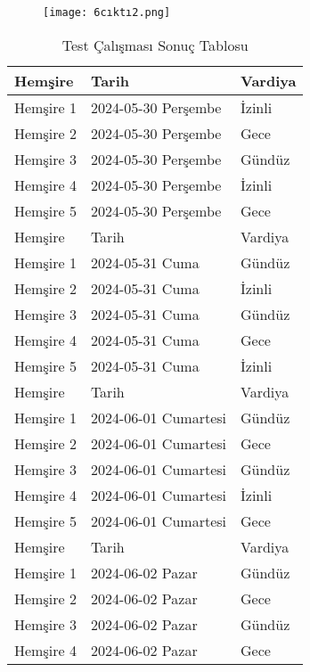\documentclass[12pt, a4paper]{article}
\begin{document}
\begin{flushleft}
\begin{figure}[!h]
	\centering
	\texttt{[image: 6cıktı2.png]}
	\\[20pt]
\end{figure}

\begin{table}
	\begin{flushleft}
		\caption{Test Çalışması Sonuç Tablosu}
	\end{flushleft}
	
\begin{tabular}{l|l|l|}
	
	\rowcolor{yellow}
	Hemşire & Tarih & Vardiya  \\
	\hline
	Hemşire 1  & 2024-05-30 Perşembe  &  İzinli  \\
	Hemşire	2 & 2024-05-30 Perşembe & Gece  \\
	Hemşire	3 & 2024-05-30 Perşembe & Gündüz \\
	Hemşire	4 & 2024-05-30 Perşembe & İzinli \\
	Hemşire	5 & 2024-05-30 Perşembe & Gece \\
	\rowcolor{yellow}
	\hline Hemşire & Tarih & Vardiya  \\
	\hline
	Hemşire 1  & 2024-05-31 Cuma  &  Gündüz  \\
	Hemşire	2 & 2024-05-31 Cuma & İzinli  \\
	Hemşire	3 & 2024-05-31 Cuma & Gündüz\\
	Hemşire	4 & 2024-05-31 Cuma & Gece \\
	Hemşire	5 & 2024-05-31 Cuma & İzinli\\
	\rowcolor{yellow}
	\hline Hemşire & Tarih & Vardiya  \\
	\hline
	Hemşire 1  & 2024-06-01 Cumartesi  &  Gündüz  \\
	Hemşire	2 & 2024-06-01 Cumartesi & Gece  \\
	Hemşire	3 & 2024-06-01 Cumartesi & Gündüz \\
	Hemşire	4 & 2024-06-01 Cumartesi & İzinli \\
	Hemşire	5 & 2024-06-01 Cumartesi & Gece \\
	\rowcolor{yellow}
	\hline Hemşire & Tarih & Vardiya  \\
	\hline
	Hemşire 1  & 2024-06-02 Pazar  &  Gündüz  \\
	Hemşire	2 & 2024-06-02 Pazar & Gece  \\
	Hemşire	3 & 2024-06-02 Pazar & Gündüz \\
	Hemşire	4 & 2024-06-02 Pazar & Gece \\

\end{tabular}
\end{table}
\end{flushleft}
\end{document}
